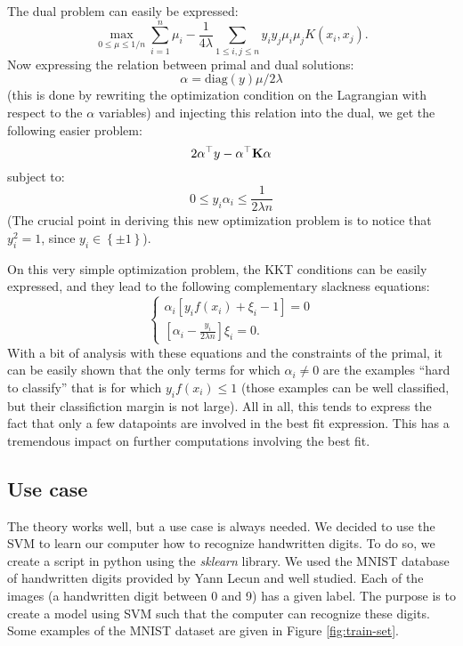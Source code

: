 \documentclass[a4paper, 11pt]{article}
\newcommand{\K}{\bold{K}}
\newcommand{\pmset}{\left\{\pm1\right\}}
\begin{document}
The dual problem can easily be expressed:
\begin{equation}
  \max\limits_{0\leq\mu\leq 1/n}
  \sum\limits_{i=1}^n\mu_i
  - \frac{1}{4\lambda}\sum\limits_{1\leq i,j \leq n}y_iy_j\mu_i\mu_jK(x_i, x_j).
\end{equation}
Now expressing the relation between primal and dual solutions:
\begin{equation}
  \alpha = \text{diag}(y)\mu/2\lambda
\end{equation}
(this is done by rewriting the optimization condition on the
Lagrangian with respect to the $\alpha$ variables)
and injecting this relation into the dual, we get the following
easier problem:
\begin{equation}
  2\alpha^\top y - \alpha^\top \K \alpha
\end{equation}
subject to:
\begin{equation}
  0 \leq y_i\alpha_i \leq \frac{1}{2\lambda n}
\end{equation}
(The crucial point in deriving this new optimization problem is
to notice that $y_i^2 = 1$, since $y_i \in \pmset$).

On this very simple optimization problem, the KKT conditions can
be easily expressed, and they lead to the following complementary
slackness equations:
\begin{equation}
  \begin{cases}
    \alpha_i\left[y_if(x_i) + \xi_i - 1\right] = 0\\
    \left[\alpha_i - \frac{y_i}{2\lambda n}\right]\xi_i = 0.
  \end{cases}
\end{equation}
With a bit of analysis with these equations and the constraints
of the primal, it can be easily shown that the only terms for
which $\alpha_i \neq 0$ are the examples ``hard to classify'' that
is for which $y_i f(x_i) \leq 1$ (those examples can be well
classified, but their classifiction margin is not large). All in
all, this tends to express the fact that only a few datapoints
are involved in the best fit expression. This has a tremendous
impact on further computations involving the best fit.

\subsection{Use case}

The theory works well, but a use case is always needed. We decided to use the SVM to learn our computer how to recognize handwritten digits. To do so, we create a script in python using the {\it sklearn}\cite{python} library. We used the MNIST database of handwritten digits\cite{mnist} provided by Yann Lecun and well studied. Each of the images (a handwritten digit between 0 and 9) has a given label. The purpose is to create a model using SVM such that the computer can recognize these digits. Some examples of the MNIST dataset are given in Figure \ref{fig:train-set}. 
\end{document}

